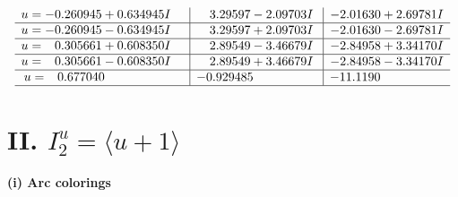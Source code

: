 \documentclass[1p]{elsarticle_modified}
\theoremstyle{definition}
\begin{document}
$$\begin{array}{c|c|c}
\begin{aligned}
u &= -0.260945 + 0.634945 I\end{aligned}
 & \phantom{-}3.29597 - 2.09703 I & -2.01630 + 2.69781 I \\ \hline\begin{aligned}
u &= -0.260945 - 0.634945 I\end{aligned}
 & \phantom{-}3.29597 + 2.09703 I & -2.01630 - 2.69781 I \\ \hline\begin{aligned}
u &= \phantom{-}0.305661 + 0.608350 I\end{aligned}
 & \phantom{-}2.89549 - 3.46679 I & -2.84958 + 3.34170 I \\ \hline\begin{aligned}
u &= \phantom{-}0.305661 - 0.608350 I\end{aligned}
 & \phantom{-}2.89549 + 3.46679 I & -2.84958 - 3.34170 I \\ \hline\begin{aligned}
u &= \phantom{-}0.677040\phantom{ +0.000000I}\end{aligned}
 & -0.929485\phantom{ +0.000000I} & -11.1190\phantom{ +0.000000I}\\
 \hline 
 \end{array}$$\newpage\newpage\renewcommand{\arraystretch}{1}
\centering \section*{II. $I^u_{2}= \langle u+1 \rangle$}
\flushleft \textbf{(i) Arc colorings}\\
\end{document}
